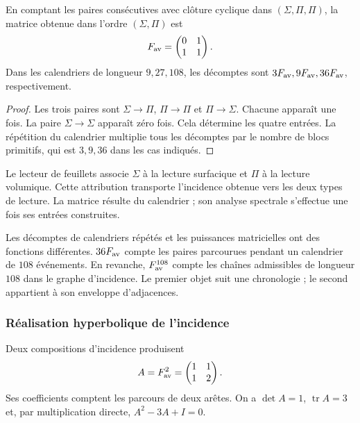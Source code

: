 \begin{teorema}
\label{eul:teo:fav}
En comptant les paires consécutives avec clôture cyclique dans
\((\Sigma,\Pi,\Pi)\), la matrice obtenue dans l’ordre \((\Sigma,\Pi)\)
est
\[
 F_{\rm av}=\begin{pmatrix}0&1\\1&1\end{pmatrix}.
\]
Dans les calendriers de longueur \(9,27,108\), les décomptes sont
\(3F_{\rm av},9F_{\rm av},36F_{\rm av}\), respectivement.
\end{teorema}
\begin{proof}
Les trois paires sont \(\Sigma\to\Pi\), \(\Pi\to\Pi\) et
\(\Pi\to\Sigma\). Chacune apparaît une fois. La paire
\(\Sigma\to\Sigma\) apparaît zéro fois. Cela détermine les quatre
entrées. La répétition du calendrier multiplie tous les décomptes
par le nombre de blocs primitifs, qui est \(3,9,36\) dans les cas
indiqués.
\end{proof}

Le lecteur de feuillets associe \(\Sigma\) à la lecture surfacique et \(\Pi\) à
la lecture volumique. Cette attribution transporte l’incidence obtenue vers
les deux types de lecture. La matrice résulte du calendrier ; son analyse
spectrale s’effectue une fois ses entrées construites.

Les décomptes de calendriers répétés et les puissances matricielles ont
des fonctions différentes. \(36F_{\rm av}\) compte les paires parcourues
pendant un calendrier de \(108\) événements. En revanche,
\(F_{\rm av}^{108}\) compte les chaînes admissibles de longueur \(108\)
dans le graphe d’incidence. Le premier objet suit une chronologie ;
le second appartient à son enveloppe d’adjacences.

\subsubsection{Réalisation hyperbolique de l’incidence}

Deux compositions d’incidence produisent
\[
 A=F_{\rm av}^2=\begin{pmatrix}1&1\\1&2\end{pmatrix}.
\]
Ses coefficients comptent les parcours de deux arêtes. On a
\(\det A=1\), \(\operatorname{tr}A=3\) et, par multiplication directe,
\(A^2-3A+I=0\).

